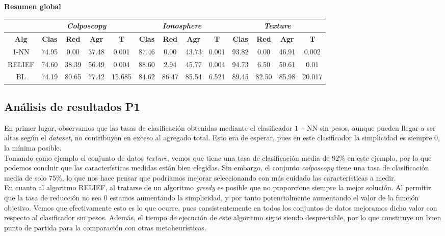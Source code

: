 \documentclass[12pt]{article}
\begin{document}
\textbf{Resumen global}

\begin{table}[h]
\begin{tabular}{ccccc|cccc|cccc}
 & \multicolumn{4}{c}{\textit{Colposcopy}} & \multicolumn{4}{c}{\textit{Ionosphere}} & \multicolumn{4}{c}{\textit{Texture}} \\ \hline
\textbf{Alg} & \textbf{Clas} & \textbf{Red} & \textbf{Agr} & \textbf{T} & \textbf{Clas} & \textbf{Red} & \textbf{Agr} & \textbf{T} & \textbf{Clas} & \textbf{Red} & \textbf{Agr} & \textbf{T} \\ \hline
1-NN & 74.95 & 0.00 & 37.48 & 0.001 & 87.46 & 0.00 & 43.73 & 0.001 & 93.82 & 0.00 & 46.91 & 0.002\\
RELIEF & 74.60 & 38.39 & 56.49 & 0.004 & 88.60 & 2.94 & 45.77 & 0.004 & 94.73 & 6.50 & 50.61 & 0.01\\
BL & 74.19 & 80.65 & 77.42 & 15.685 & 84.62 & 86.47 & 85.54 & 6.521 & 89.45 & 82.50 & 85.98 & 20.017\\
\end{tabular}
\end{table}

\subsection*{{\color{red}Análisis de resultados P1}}

En primer lugar, observamos que las tasas de clasificación obtenidas mediante el clasificador $1-$NN sin pesos, aunque pueden llegar a ser altas según el \textit{dataset}, no contribuyen en exceso al agregado total. Esto era de esperar, pues en este clasificador la simplicidad es siempre $0$, la mínima posible.\\

Tomando como ejemplo el conjunto de datos \textit{texture}, vemos que tiene una tasa de clasificación media de $92\%$ en este ejemplo, por lo que podemos concluir que las características medidas están bien elegidas. Sin embargo, el conjunto \textit{colposcopy} tiene una tasa de clasificación media de solo $75\%$, lo que nos hace pensar que podríamos mejorar seleccionando con más cuidado las características a medir.\\

En cuanto al algoritmo RELIEF, al tratarse de un algoritmo \textit{greedy} es posible que no proporcione siempre la mejor solución. Al permitir que la tasa de reducción no sea $0$ estamos aumentando la simplicidad, y por tanto potencialmente aumentando el valor de la función objetivo. Vemos que efectivamente esto es lo que ocurre, pues consistentemente en todos los conjuntos de datos mejoramos dicho valor con respecto al clasificador sin pesos. Además, el tiempo de ejecución de este algoritmo sigue siendo despreciable, por lo que constituye un buen punto de partida para la comparación con otras metaheurísticas.\\
\end{document}
